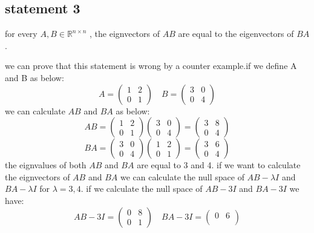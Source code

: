 \subsection{statement 3}
for every $A,B \in \mathbb{R}^{n\times n}$ , the eignvectors of $AB$ are equal to the eigenvectors of $BA$.
\begin{qsolve}
	\begin{qsolve}[]
			we can prove that this statement is wrong by a counter example.if we define A and B as below:
			$$A = \begin{pmatrix}
				1 & 2 \\
				0 & 1
			\end{pmatrix} \quad B = \begin{pmatrix}
				3 & 0 \\
				0 & 4
			\end{pmatrix}$$
			we can calculate $AB$ and $BA$ as below:
			$$AB = \begin{pmatrix}
				1 & 2 \\
				0 & 1
			\end{pmatrix} \begin{pmatrix}
				3 & 0 \\
				0 & 4
			\end{pmatrix} = \begin{pmatrix}
				3 & 8 \\
				0 & 4
				\end{pmatrix}$$
			$$BA = \begin{pmatrix}
				3 & 0 \\
				0 & 4
			\end{pmatrix} \begin{pmatrix}
				1 & 2 \\
				0 & 1
			\end{pmatrix} = \begin{pmatrix}
				3 & 6 \\
				0 & 4
			\end{pmatrix}$$
			the eignvalues of both $AB$ and $BA$ are equal to 3 and 4. if we want to calculate the eignvectors of $AB$ and $BA$ we can calculate the null space of $AB - \lambda I$ and $BA - \lambda I$ for $\lambda = 3,4$. if we calculate the null space of $AB - 3I$ and $BA - 3I$ we have:
			$$AB - 3I = \begin{pmatrix}
				0 & 8 \\
				0 & 1
			\end{pmatrix} \quad BA - 3I = \begin{pmatrix}
				0 & 6 \\

\end{pmatrix}$$
\end{qsolve}
\end{qsolve}
